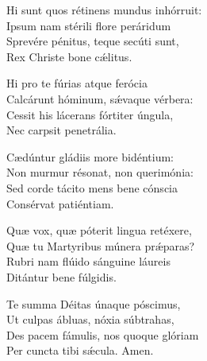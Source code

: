Hi sunt quos rétinens mundus inhórruit:\\
Ipsum nam stérili flore peráridum\\
Sprevére pénitus, teque secúti sunt,\\
Rex Christe bone cǽlitus.

Hi pro te fúrias atque ferócia\\
Calcárunt hóminum, sǽvaque vérbera:\\
Cessit his lácerans fórtiter úngula,\\
Nec carpsit penetrália.

Cædúntur gládiis more bidéntium:\\
Non murmur résonat, non querimónia:\\
Sed corde tácito mens bene cónscia\\
Consérvat patiéntiam.

Quæ vox, quæ póterit lingua retéxere,\\
Quæ tu Martyribus múnera prǽparas?\\
Rubri nam flúido sánguine láureis\\
Ditántur bene fúlgidis.

Te summa Déitas únaque póscimus,\\
Ut culpas ábluas, nóxia súbtrahas,\\
Des pacem fámulis, nos quoque glóriam\\
Per cuncta tibi sǽcula.
Amen.